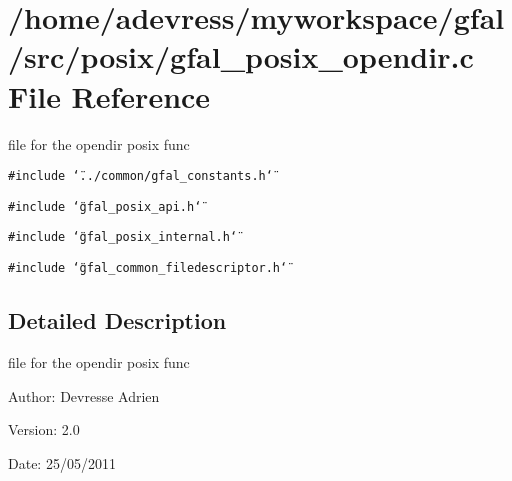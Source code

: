 \section{/home/adevress/myworkspace/gfal/src/posix/gfal\_\-posix\_\-opendir.c File Reference}
\label{gfal__posix__opendir_8c}
file for the opendir posix func 

{\tt \#include \char`\"{}../common/gfal\_\-constants.h\char`\"{}}\par
{\tt \#include \char`\"{}gfal\_\-posix\_\-api.h\char`\"{}}\par
{\tt \#include \char`\"{}gfal\_\-posix\_\-internal.h\char`\"{}}\par
{\tt \#include \char`\"{}gfal\_\-common\_\-filedescriptor.h\char`\"{}}\par


\subsection{Detailed Description}
file for the opendir posix func 

\begin{Desc}
\item[Author:]Devresse Adrien \end{Desc}
\begin{Desc}
\item[Version:]2.0 \end{Desc}
\begin{Desc}
\item[Date:]25/05/2011 \end{Desc}
